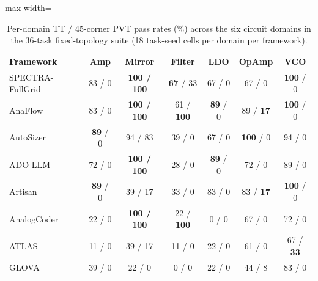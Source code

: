 \begin{table}[ht]
\centering
\caption{Per-domain TT / 45-corner PVT pass rates (\%) across the six circuit domains in the 36-task fixed-topology suite (18 task-seed cells per domain per framework).}
\label{tab:supp_domain}
\scriptsize
\setlength{\tabcolsep}{2.2pt}
\begin{adjustbox}{max width=\columnwidth}
\begin{tabular}{@{}lcccccc@{}}
\toprule
Framework & Amp & Mirror & Filter & LDO & OpAmp & VCO \\
\midrule
SPECTRA-FullGrid & 83 / 0 & \textbf{100 / 100} & \textbf{67} / 33 & 67 / 0 & 67 / 0 & \textbf{100} / 0 \\
AnaFlow~\cite{ahmadzadeh2025anaflow} & 83 / 0 & \textbf{100 / 100} & 61 / \textbf{100} & \textbf{89} / 0 & 89 / \textbf{17} & \textbf{100} / 0 \\
AutoSizer~\cite{yu2026autosizer} & \textbf{89} / 0 & 94 / 83 & 39 / 0 & 67 / 0 & \textbf{100} / 0 & 94 / 0 \\
ADO-LLM~\cite{yin2024adollm} & 72 / 0 & \textbf{100 / 100} & 28 / 0 & \textbf{89} / 0 & 72 / 0 & 89 / 0 \\
Artisan~\cite{chen2024artisan} & \textbf{89} / 0 & 39 / 17 & 33 / 0 & 83 / 0 & 83 / \textbf{17} & \textbf{100} / 0 \\
AnalogCoder~\cite{lai2025analogcoder} & 22 / 0 & \textbf{100 / 100} & 22 / \textbf{100} & 0 / 0 & 67 / 0 & 72 / 0 \\
ATLAS~\cite{oh2026atlas} & 11 / 0 & 39 / 17 & 11 / 0 & 22 / 0 & 61 / 0 & 67 / \textbf{33} \\
GLOVA~\cite{kim2025glova} & 39 / 0 & 22 / 0 & 0 / 0 & 22 / 0 & 44 / 8 & 83 / 0 \\
\bottomrule
\end{tabular}
\end{adjustbox}
\end{table}


